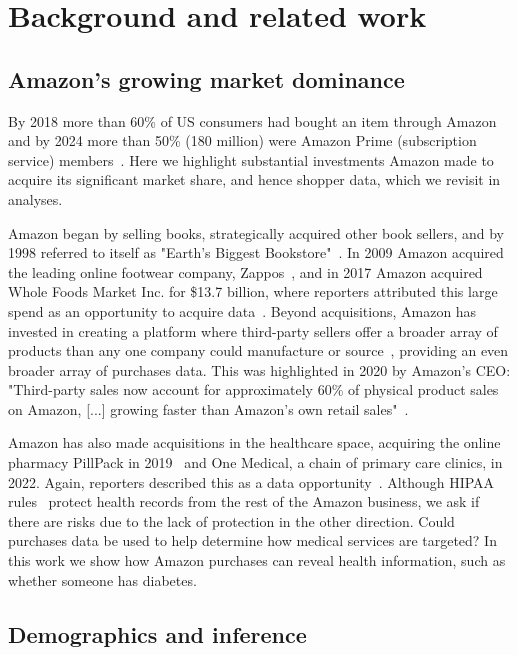 \section{Background and related work}
\subsection{Amazon's growing market dominance}
\label{section:background:amazon}

By 2018 more than 60\% of US consumers had bought an item through Amazon~\cite{npr/maristpoll2018} and by 2024 more than 50\% (180 million) were Amazon Prime (subscription service) members~\cite{bloomberg2024}. Here we highlight substantial investments Amazon made to acquire its significant market share, and hence shopper data, which we revisit in analyses.

Amazon began by selling books, strategically acquired other book sellers, and by 1998 referred to itself as "Earth's Biggest Bookstore"~\cite{secinfo98}.
In 2009 Amazon acquired the leading online footwear company, Zappos~\cite{zapposSEC2009}, and in 2017 Amazon acquired Whole Foods Market Inc. for \$13.7 billion, where reporters attributed this large spend as an opportunity to acquire data~\cite{wsjWF2017}. 
Beyond acquisitions, Amazon has invested in creating a platform where third-party sellers offer a broader array of products than any one company could manufacture or source~\cite{weigel2023}, providing an even broader array of purchases data. This was highlighted in 2020 by Amazon's CEO:  "Third-party sales now account for approximately 60\% of physical product sales on Amazon, [...] growing faster than Amazon’s own retail sales"~\cite{amazonstaff2020}.

Amazon has also made acquisitions in the healthcare space, acquiring the online pharmacy PillPack in 2019~\cite{cnbcPillPack2019} and One Medical, a chain of primary care clinics, in 2022.  
Again, reporters described this as a data opportunity~\cite{nytimesOneMed2022}.  Although HIPAA rules~\cite{hipaa} protect health records from the rest of the Amazon business, we ask if there are risks due to the lack of protection in the other direction. Could purchases data be used to help determine how medical services are targeted? In this work we show how Amazon purchases can reveal health information, such as whether someone has diabetes.


\subsection{Demographics and inference}

